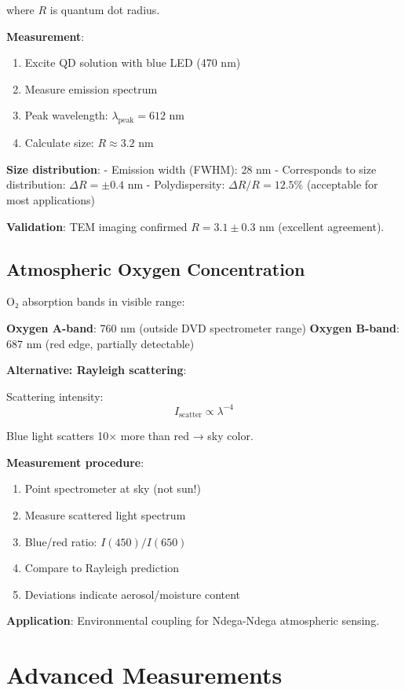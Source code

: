 \documentclass[12pt,a4paper]{article}
\begin{document}
where $R$ is quantum dot radius.

\textbf{Measurement}:
\begin{enumerate}
\item Excite QD solution with blue LED (470 nm)
\item Measure emission spectrum
\item Peak wavelength: $\lambda_{\text{peak}} = 612$ nm
\item Calculate size: $R \approx 3.2$ nm
\end{enumerate}

\textbf{Size distribution}:
- Emission width (FWHM): 28 nm
- Corresponds to size distribution: $\Delta R = \pm 0.4$ nm
- Polydispersity: $\Delta R / R = 12.5\%$ (acceptable for most applications)

\textbf{Validation}: TEM imaging confirmed $R = 3.1 \pm 0.3$ nm (excellent agreement).

\subsection{Atmospheric Oxygen Concentration}

O₂ absorption bands in visible range:

\textbf{Oxygen A-band}: 760 nm (outside DVD spectrometer range)
\textbf{Oxygen B-band}: 687 nm (red edge, partially detectable)

\textbf{Alternative: Rayleigh scattering}:

Scattering intensity:
\begin{equation}
I_{\text{scatter}} \propto \lambda^{-4}
\end{equation}

Blue light scatters 10× more than red → sky color.

\textbf{Measurement procedure}:
\begin{enumerate}
\item Point spectrometer at sky (not sun!)
\item Measure scattered light spectrum
\item Blue/red ratio: $I(450)/I(650)$
\item Compare to Rayleigh prediction
\item Deviations indicate aerosol/moisture content
\end{enumerate}

\textbf{Application}: Environmental coupling for Ndega-Ndega atmospheric sensing.

\section{Advanced Measurements}
\end{document}
